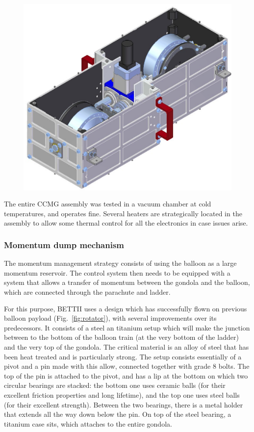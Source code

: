 \begin{figure}[!ht]
	\centering
	\includegraphics[width=\textwidth]{Figures/CCMG-case.png}
	\caption{}
	\label{fig:CCMGcase}
    \end{figure}


The entire CCMG assembly was tested in a vacuum chamber at cold temperatures, and operates fine. Several heaters are strategically located in the assembly to allow some thermal control for all the electronics in case issues arise.

\subsubsection{Momentum dump mechanism}
\label{subsec:chap3momdumpmotor}

The momentum management strategy consists of using the balloon as a large momentum reservoir. The control system then needs to be equipped with a system that allows a transfer of momentum between the gondola and the balloon, which are connected through the parachute and ladder. 

For this purpose, BETTII uses a design which has successfully flown on previous balloon payload (Fig.~\ref{fig:rotator}), with several improvements over its predecessors. It consists of a steel an titanium setup which will make the junction between to the bottom of the balloon train (at the very bottom of the ladder) and the very top of the gondola. The critical material is an alloy of steel that has been heat treated and is particularly strong. The setup consists essentially of a pivot and a pin made with this allow, connected together with grade 8 bolts. The top of the pin is attached to the pivot, and has a lip at the bottom on which two circular bearings are stacked: the bottom one uses ceramic balls (for their excellent friction properties and long lifetime), and the top one uses steel balls (for their excellent strength). Between the two bearings, there is a metal holder that extends all the way down below the pin. On top of the steel bearing, a titanium case sits, which attaches to the entire gondola. 

